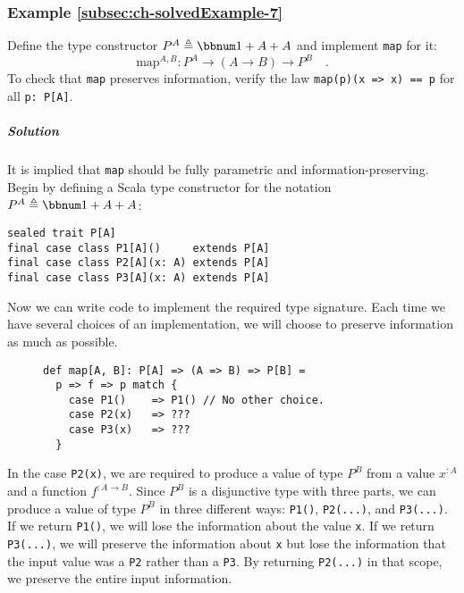 \subsubsection{Example \label{subsec:ch-solvedExample-7}\ref{subsec:ch-solvedExample-7}}

Define the type constructor $P^{A}\triangleq\bbnum 1+A+A$ and implement
\lstinline!map! for it:
\[
\text{map}^{A,B}:P^{A}\rightarrow(A\rightarrow B)\rightarrow P^{B}\quad.
\]
To check that \lstinline!map! preserves information, verify the law
\lstinline!map(p)(x => x) == p! for all \lstinline!p: P[A]!.

\subparagraph{Solution}

It is implied that \lstinline!map! should be fully parametric and
information-preserving. Begin by defining a Scala type constructor
for the notation $P^{A}\triangleq\bbnum 1+A+A$:
\begin{lstlisting}
sealed trait P[A]
final case class P1[A]()     extends P[A]
final case class P2[A](x: A) extends P[A]
final case class P3[A](x: A) extends P[A]
\end{lstlisting}
Now we can write code to implement the required type signature. Each
time we have several choices of an implementation, we will choose
to preserve information as much as possible.

\begin{wrapfigure}{l}{0.45\columnwidth}%
\vspace{-0.75\baselineskip}

\begin{lstlisting}
def map[A, B]: P[A] => (A => B) => P[B] =
  p => f => p match {
    case P1()    => P1() // No other choice.
    case P2(x)   => ???
    case P3(x)   => ???
  }
\end{lstlisting}
\vspace{-0.9\baselineskip}
\end{wrapfigure}%

\noindent In the case \lstinline!P2(x)!, we are required to produce
a value of type $P^{B}$ from a value $x^{:A}$ and a function $f^{:A\rightarrow B}$.
Since $P^{B}$ is a disjunctive type with three parts, we can produce
a value of type $P^{B}$ in three different ways: \lstinline!P1()!,
\lstinline!P2(...)!, and \lstinline!P3(...)!. If we return \lstinline!P1()!,
we will lose the information about the value \lstinline!x!. If we
return \lstinline!P3(...)!, we will preserve the information about
\lstinline!x! but lose the information that
the input value was a \lstinline!P2! rather than a \lstinline!P3!.
By returning \lstinline!P2(...)! in that scope, we preserve the entire
input information. 

